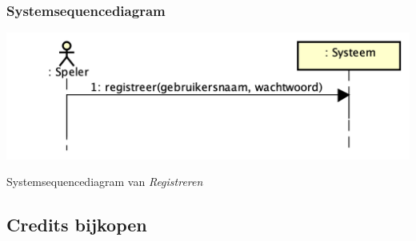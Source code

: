 \subsubsection{Systemsequencediagram}
\begin{mpfigure}
   \centering
   \includegraphics[width=\linewidth]{../Afbeeldingen/Registreren sequence diagram.png}
   \caption{Systemsequencediagram van \textit{Registreren}} \label{fig:ssdregistreren}
\end{mpfigure}


\clearpage\label{sec:usecasecreditsbijkopen}\subsection{Credits bijkopen}


